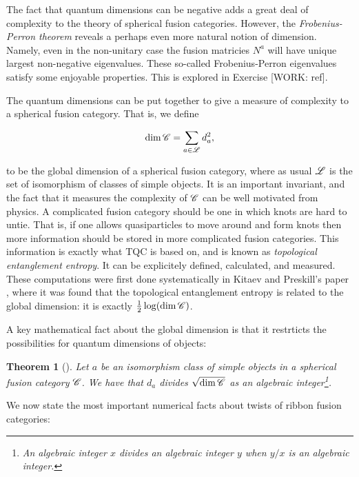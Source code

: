 \documentclass{article}
\newtheorem{theorem}{Theorem}[section]
\theoremstyle{definition}
\numberwithin{figure}{section}
\begin{document}
The fact that quantum dimensions can be negative adds a great deal of complexity to the theory of spherical fusion categories. However, the \textit{Frobenius-Perron theorem} reveals a perhaps even more natural notion of dimension. Namely, even in the non-unitary case the fusion matricies $N^a$ will have unique largest non-negative eigenvalues. These so-called Frobenius-Perron eigenvalues satisfy some enjoyable properties. This is explored in Exercise [WORK: ref].

The quantum dimensions can be put together to give a measure of complexity to a spherical fusion category. That is, we define

$$\dim \mathscr{C} = \sum_{a\in \mathscr{L}} d_a^2,$$

to be the global dimension of a spherical fusion category, where as usual $\mathscr{L}$ is the set of isomorphism of classes of simple objects. It is an important invariant, and the fact that it measures the complexity of $\mathscr{C}$ can be well motivated from physics. A complicated fusion category should be one in which knots are hard to untie. That is, if one allows quasiparticles to move around and form knots then more information should be stored in more complicated fusion categories. This information is exactly what TQC is based on, and is known as \textit{topological entanglement entropy}. It can be explicitely defined, calculated, and measured. These computations were first done systematically in Kitaev and Preskill's paper \cite{kitaev2006topological}, where it was found that the topological entanglement entropy is related to the global dimension: it is exactly $\frac{1}{2}\log(\dim \mathscr{C})$. 

A key mathematical fact about the global dimension is that it restrticts the possibilities for quantum dimensions of objects:

\begin{theorem}[\cite{etingof1997some}] Let $a$ be an isomorphism class of simple objects in a spherical fusion category $\mathscr{C}$. We have that $d_a$ divides $\sqrt{\dim \mathscr{C}}$ as an algebraic integer\footnote{An algebraic integer $x$ divides an algebraic integer $y$ when $y/x$ is an algebraic integer.}.
\end{theorem}

We now state the most important numerical facts about twists of ribbon fusion categories:
\end{document}
